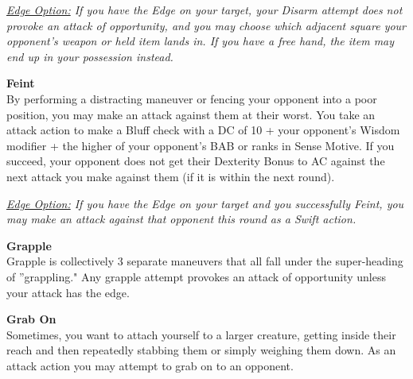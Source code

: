 

\smallskip\emph{\underline{Edge Option:} If you have the Edge on your target, your Disarm attempt does not provoke an attack of opportunity, and you may choose which adjacent square your opponent's weapon or held item lands in. If you have a free hand, the item may end up in your possession instead.}\\

\hypertarget{combat:feint}{}
\normalsize\item\textbf{{Feint}}\\\small
By performing a distracting maneuver or fencing your opponent into a poor position, you may make an attack against them at their worst. You take an attack action to make a Bluff check with a DC of 10 + your opponent's Wisdom modifier + the higher of your opponent's BAB or ranks in Sense Motive. If you succeed, your opponent does not get their Dexterity Bonus to AC against the next attack you make against them (if it is within the next round).

\smallskip\emph{\underline{Edge Option:} If you have the Edge on your target and you successfully Feint, you may make an attack against that opponent this round as a Swift action.}\\

\hypertarget{combat:grapple}{}
\normalsize\item\textbf{{Grapple}}\\\small
Grapple is collectively 3 separate maneuvers that all fall under the super-heading of ''grappling." Any grapple attempt provokes an attack of opportunity unless your attack has the edge.

\listtwo\hypertarget{combat:grabon}{}
      \normalsize\item\textbf{{Grab On}}\\\small
      Sometimes, you want to attach yourself to a larger creature, getting inside their reach and then repeatedly stabbing them or simply weighing them down.  As an attack action you may attempt to grab on to an opponent.

